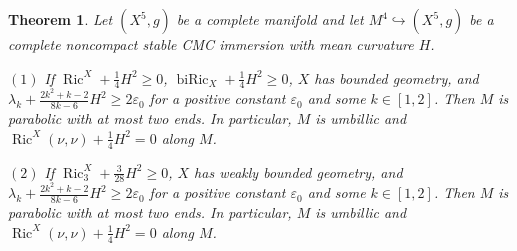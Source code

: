 \documentclass[11pt,letterpaper]{amsart}
\DeclareMathOperator{\Ric}{Ric}
\DeclareMathOperator{\biRic}{biRic}
\newtheorem{theorem}{Theorem}[section]
\theoremstyle{definition}
\theoremstyle{remark}
\numberwithin{equation}{section}
\begin{document}


\begin{theorem} \label{maintheorem5.1}   Let $(X^{5},g)$ be a complete manifold and let $M^4\hookrightarrow (X^{5},g)$ be a complete noncompact stable CMC immersion with  mean curvature $H$. 

    $(1)$ If $\Ric^X+\frac{1}{4}H^2\geq 0$, $\biRic_X+\frac{1}{4}H^2\geq 0$, $X$ has bounded geometry, and $\lambda_k+\frac{2k^2+k-2}{8k-6}H^2\geq 2\varepsilon_0$ for a positive constant $\varepsilon_0$ and some $k\in[1,2]$.  Then $M$ is parabolic with at most two ends. In particular, $M$ is umbillic and $\Ric^X(\nu,\nu)+\frac{1}{4}H^2=0$ along $M$.

    $(2)$ If $\Ric^X_{3}+\frac{3}{28}H^2 \geq 0$, $X$ has weakly bounded geometry, and $\lambda_k+\frac{2k^2+k-2}{8k-6}H^2\geq 2\varepsilon_0$ for a positive constant $\varepsilon_0$ and some $k\in[1,2]$.  Then $M$ is parabolic with at most two ends. In particular, $M$ is umbillic and $\Ric^X(\nu,\nu)+\frac{1}{4}H^2=0$ along $M$.
\end{theorem}
\end{document}
